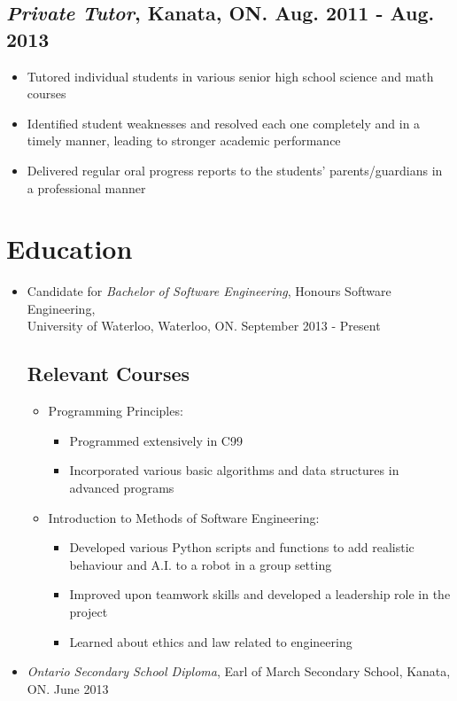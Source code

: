 \documentclass[12pt]{article}
\begin{document}
	\subsection*{\textit{Private Tutor}, Kanata, ON. Aug. 2011 - Aug. 2013}
		\begin{itemize} \vspace{-10pt}
		\item Tutored individual students in various senior high school science and math courses
		\item Identified student weaknesses and resolved each one completely and in a timely manner, leading to stronger academic performance
		\item Delivered regular oral progress reports to the students' parents/guardians in a professional manner
		\end{itemize}

\section*{Education} \vspace{-12pt}
	\begin{itemize}
	\item Candidate for \textit{Bachelor of Software Engineering}, Honours Software Engineering, \\University of Waterloo, Waterloo, ON. September 2013 - Present \vspace*{-18pt}
		\subsection*{Relevant Courses} \vspace*{-10pt}
			\begin{itemize}
			\item Programming Principles:
				\begin{itemize}
				\item Programmed extensively in C99
				\item Incorporated various basic algorithms and data structures in advanced programs
				\end{itemize}							
			\item Introduction to Methods of Software Engineering:
				\begin{itemize}
				\item Developed various Python scripts and functions to add realistic behaviour and A.I. to a robot in a group setting
				\item Improved upon teamwork skills and developed a leadership role in the project 				
				\item Learned about ethics and law related to engineering 
				\end{itemize}			
			\end{itemize}
		\item \textit{Ontario Secondary School Diploma}, Earl of March Secondary School, Kanata, ON. June 2013
		\end{itemize}
\end{document}
